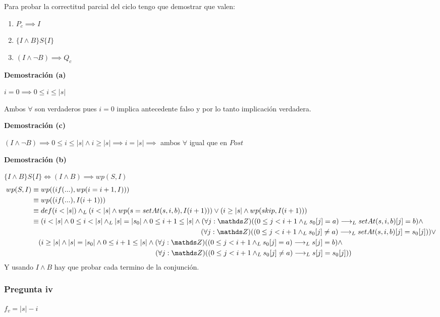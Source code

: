 Para probar la correctitud parcial del ciclo tengo que demostrar que valen:
\begin{enumerate}[label=(\alph*)]
    \item $ P_c \implies I $
    \item $ \{ I \wedge B \} S \{ I \} $
    \item $ (I \wedge \neg B) \implies Q_c $
\end{enumerate}

\textbf{Demostración (a)}

$ i = 0 \implies 0 \leq i \leq |s| $

Ambos $ \forall $ son verdaderos pues $ i = 0 $ implica antecedente falso y por lo tanto implicación verdadera.

\textbf{Demostración (c)}

$ (I \wedge \neg B) \implies 0 \leq i \leq |s| \wedge i \geq |s| \implies i = |s| \implies $ ambos $ \forall $ igual que en $Post$

\textbf{Demostración (b)}

$ \{ I \wedge B \} S \{ I \} \iff (I \wedge B) \implies wp(S, I) $
\begin{align*}
    wp(S, I) &\equiv wp((if(...), wp(i=i+1, I))) \\
    &\equiv wp((if(...), I(i+1))) \\
    &\equiv def(i < |s|) \yLuego (i < |s| \wedge wp(s=setAt(s, i, b), I(i+1))) \vee (i \geq |s| \wedge wp(skip, I(i+1))) \\
    &\equiv (i < |s| \wedge 0 \leq i < |s| \yLuego |s| = |s_0| \wedge 0 \leq i+1 \leq |s| \wedge (\forall j: \ent)((0 \leq j < i+1 \yLuego s_0[j] = a) \implicaLuego setAt(s, i, b)[j] = b) \wedge \\
    &\qquad \qquad \qquad \qquad \qquad \qquad \qquad \qquad \qquad \qquad \qquad \qquad (\forall j: \ent)((0 \leq j < i+1 \yLuego s_0[j] \neq a) \implicaLuego setAt(s, i, b)[j] = s_0[j])) \vee \\
    &\quad (i \geq |s| \wedge |s| = |s_0| \wedge 0 \leq i+1 \leq |s| \wedge (\forall j: \ent)((0 \leq j < i+1 \yLuego s_0[j] = a) \implicaLuego s[j] = b) \wedge \\
    &\qquad \qquad \qquad \qquad \qquad \qquad \qquad \qquad \quad \; \; (\forall j: \ent)((0 \leq j < i+1 \yLuego s_0[j] \neq a) \implicaLuego s[j] = s_0[j])) \\
\end{align*}
Y usando $ I \wedge B $ hay que probar cada termino de la conjunción.

\subsubsection{Pregunta iv}

$ f_v = |s| - i $

